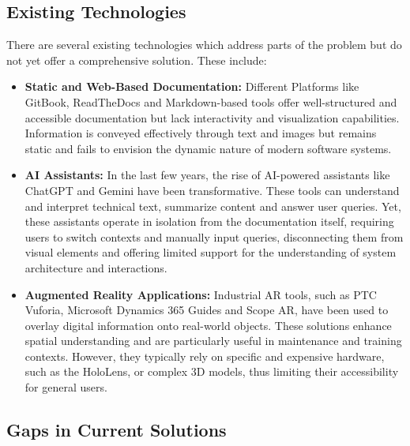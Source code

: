 \documentclass[12pt]{article}
\begin{document}
    \subsection{Existing Technologies}

    There are several existing technologies which address parts of the problem but do not yet offer a comprehensive solution. These include:
        \begin{itemize}
            \item \textbf{Static and Web-Based Documentation:}
                Different Platforms like GitBook, ReadTheDocs and Markdown-based tools offer well-structured and accessible documentation but lack interactivity and visualization capabilities. Information is conveyed effectively through text and images
                but remains static and fails to envision the dynamic nature of modern software systems.
            \item \textbf{AI Assistants:}
                In the last few years, the rise of AI-powered assistants like ChatGPT and Gemini have been transformative. These tools can understand and interpret technical text, summarize content and answer user queries. Yet, these
                assistants operate in isolation from the documentation itself, requiring users to switch contexts and manually input queries, disconnecting them from visual elements and offering limited support for the understanding of
                system architecture and interactions.
            \item \textbf{Augmented Reality Applications:}
                Industrial AR tools, such as PTC Vuforia, Microsoft Dynamics 365 Guides and Scope AR, have been used to overlay digital information onto real-world objects. These solutions enhance spatial understanding and are particularly useful in maintenance
                and training contexts. However, they typically rely on specific and expensive hardware, such as the HoloLens, or complex 3D models, thus limiting their accessibility for general users.
        \end{itemize}

    \subsection{Gaps in Current Solutions}
\end{document}
